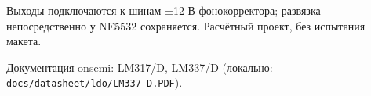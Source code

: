 \documentclass[a4paper,landscape,10pt]{article}
\begin{document}
\vfill
\footnotesize
Выходы подключаются к шинам ±12 В фонокорректора; развязка непосредственно у NE5532 сохраняется.
Расчётный проект, без испытания макета.\par
Документация onsemi:
\href{https://www.onsemi.com/pdf/datasheet/lm317-d.pdf}{LM317/D},
\href{https://www.onsemi.com/pdf/datasheet/lm337-d.pdf}{LM337/D}
(локально: \texttt{docs/datasheet/ldo/LM337-D.PDF}).
\end{document}
